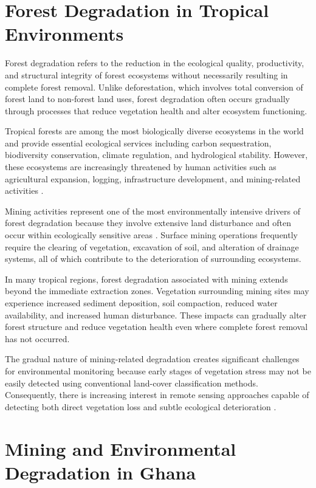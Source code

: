 \documentclass[a4paper,12pt]{report}
\begin{document}
\section{Forest Degradation in Tropical Environments}

Forest degradation refers to the reduction in the ecological quality, productivity, and structural integrity of forest ecosystems without necessarily resulting in complete forest removal. Unlike deforestation, which involves total conversion of forest land to non-forest land uses, forest degradation often occurs gradually through processes that reduce vegetation health and alter ecosystem functioning.

Tropical forests are among the most biologically diverse ecosystems in the world and provide essential ecological services including carbon sequestration, biodiversity conservation, climate regulation, and hydrological stability. However, these ecosystems are increasingly threatened by human activities such as agricultural expansion, logging, infrastructure development, and mining-related activities \citep{asner2005selective,sonter2017mining}.

Mining activities represent one of the most environmentally intensive drivers of forest degradation because they involve extensive land disturbance and often occur within ecologically sensitive areas \citep{hilson2002land}. Surface mining operations frequently require the clearing of vegetation, excavation of soil, and alteration of drainage systems, all of which contribute to the deterioration of surrounding ecosystems.

In many tropical regions, forest degradation associated with mining extends beyond the immediate extraction zones. Vegetation surrounding mining sites may experience increased sediment deposition, soil compaction, reduced water availability, and increased human disturbance. These impacts can gradually alter forest structure and reduce vegetation health even where complete forest removal has not occurred.

The gradual nature of mining-related degradation creates significant challenges for environmental monitoring because early stages of vegetation stress may not be easily detected using conventional land-cover classification methods. Consequently, there is increasing interest in remote sensing approaches capable of detecting both direct vegetation loss and subtle ecological deterioration \citep{richards2013remote,tarazona2020monitoring}.

\section{Mining and Environmental Degradation in Ghana}
\end{document}
